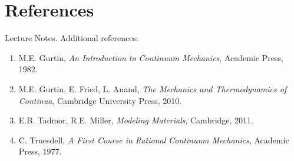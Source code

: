 \documentclass[11pt,a4paper]{scrartcl}
\begin{document}
%	
%	

	
%	
	
	\section{References}
	
Lecture Notes. Additional references:	
	
	\begin{enumerate}
		\item M.E. Gurtin, \textit{An Introduction to Continuum Mechanics}, Academic Press, 1982.
		\item M.E. Gurtin, E. Fried, L. Anand, \textit{The Mechanics and Thermodynamics of Continua}, Cambridge University Press, 2010.
		\item E.B. Tadmor, R.E. Miller, 	\textit{Modeling Materials}, Cambridge, 2011.
		\item C. Truesdell, \textit{A First Course in Rational Continuum Mechanics}, Academic Press, 1977.
	
	\end{enumerate}
	
	
\end{document}
